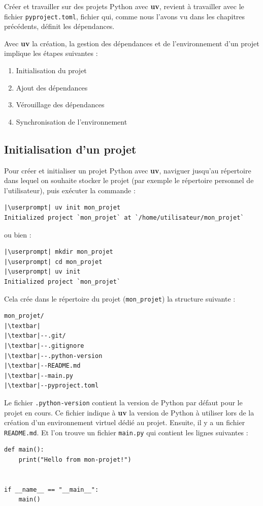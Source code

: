 Créer et travailler sur des projets Python avec \textbf{uv}, revient à travailler avec le fichier \texttt{pyproject.toml}, fichier qui, comme nous l'avons vu dans les chapitres précédents, définit les dépendances.

Avec \textbf{uv} la création, la gestion des dépendances et de l'environnement d'un projet implique les étapes suivantes :
\begin{enumerate}
    \item Initialisation du projet
    \item Ajout des dépendances
    \item Vérouillage des dépendances
    \item Synchronisation de l'environnement 
\end{enumerate}

\subsection*{Initialisation d'un projet}

Pour créer et initialiser un projet Python avec \textbf{uv}, naviguer jusqu'au répertoire dans lequel on souhaite stocker le projet (par exemple le répertoire personnel de l'utilisateur), puis exécuter la commande :
\begin{lstlisting}[style=bash]
|\userprompt| uv init mon_projet
Initialized project `mon_projet` at `/home/utilisateur/mon_projet`
\end{lstlisting}

ou bien :
\begin{lstlisting}[style=bash]
|\userprompt| mkdir mon_projet
|\userprompt| cd mon_projet
|\userprompt| uv init
Initialized project `mon_projet`
\end{lstlisting}

Cela crée dans le répertoire du projet (\texttt{mon\_projet}) la structure suivante :
\begin{lstlisting}[style=tree]
mon_projet/
|\textbar|
|\textbar|--.git/
|\textbar|--.gitignore
|\textbar|--.python-version
|\textbar|--README.md
|\textbar|--main.py
|\textbar|--pyproject.toml
\end{lstlisting}

Le fichier \texttt{.python-version} contient la version de Python par défaut pour le projet en cours. Ce fichier indique à \textbf{uv} la version de Python à utiliser lors de la création d'un environnement virtuel dédié au projet. Ensuite, il y a un fichier \texttt{README.md}.  Et l'on trouve un fichier \texttt{main.py} qui contient les lignes suivantes :
\begin{lstlisting}[style=python]
def main():
    print("Hello from mon-projet!")


if __name__ == "__main__":
    main()
\end{lstlisting}

